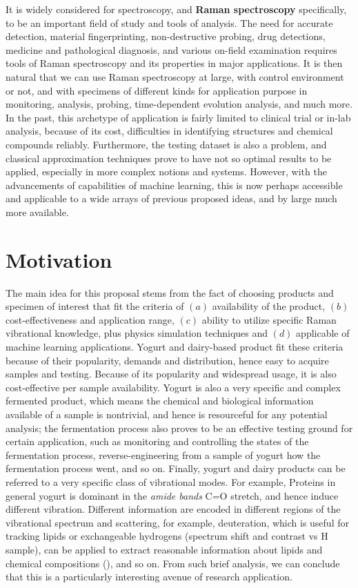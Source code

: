 \documentclass{iopjournal}
\begin{document}
It is widely considered for spectroscopy, and \textbf{Raman spectroscopy} specifically, to be an important field of study and tools of analysis. The need for accurate detection, material fingerprinting, non-destructive probing, drug detections, medicine and pathological diagnosis, and various on-field examination requires tools of Raman spectroscopy and its properties in major applications. It is then natural that we can use Raman spectroscopy at large, with control environment or not, and with specimens of different kinds for application purpose in monitoring, analysis, probing, time-dependent evolution analysis, and much more. In the past, this archetype of application is fairly limited to clinical trial or in-lab analysis, because of its cost, difficulties in identifying structures and chemical compounds reliably. Furthermore, the testing dataset is also a problem, and classical approximation techniques prove to have not so optimal results to be applied, especially in more complex notions and systems. However, with the advancements of capabilities of machine learning, this is now perhaps accessible and applicable to a wide arrays of previous proposed ideas, and by large much more available. 
\section{Motivation}

The main idea for this proposal stems from the fact of choosing products and specimen of interest that fit the criteria of $(a)$ availability of the product, $(b)$ cost-effectiveness and application range, $(c)$ ability to utilize specific Raman vibrational knowledge, plus physics simulation techniques and $(d)$ applicable of machine learning applications. Yogurt and dairy-based product fit these criteria because of their popularity, demands and distribution, hence easy to acquire samples and testing. Because of its popularity and widespread usage, it is also cost-effective per sample availability. Yogurt is also a very specific and complex fermented product, which means the chemical and biological information available of a sample is nontrivial, and hence is resourceful for any potential analysis; the fermentation process also proves to be an effective testing ground for certain application, such as monitoring and controlling the states of the fermentation process, reverse-engineering from a sample of yogurt how the fermentation process went, and so on. Finally, yogurt and dairy products can be referred to a very specific class of vibrational modes. For example, Proteins in general yogurt is dominant in the \textit{amide bands} C=O stretch, and hence induce different vibration. Different information are encoded in different regions of the vibrational spectrum and scattering, for example, deuteration, which is useful for tracking lipids or exchangeable hydrogens (spectrum shift and contrast vs H sample), can be applied to extract reasonable information about lipids and chemical compositions (\cite{XUE2012858}), and so on. From such brief analysis, we can conclude that this is a particularly interesting avenue of research application. 
\end{document}
